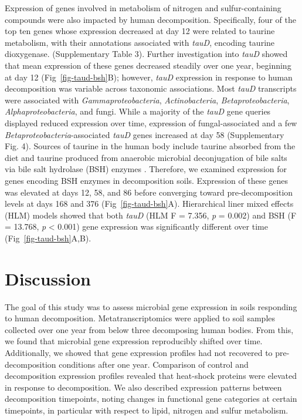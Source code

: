 \documentclass[
  sn-nature,
  lineno, referee]{sn-jnl}
\begin{document}
Expression of genes involved in metabolism of nitrogen and
sulfur-containing compounds were also impacted by human decomposition.
Specifically, four of the top ten genes whose expression decreased at
day 12 were related to taurine metabolism, with their annotations
associated with \emph{tauD}, encoding taurine dioxygenase.
(Supplementary Table 3). Further investigation into \emph{tauD} showed
that mean expression of these genes decreased steadily over one year,
beginning at day 12 (Fig~\ref{fig-taud-bsh}B); however, \emph{tauD}
expression in response to human decomposition was variable across
taxonomic associations. Most \emph{tauD} transcripts were associated
with \emph{Gammaproteobacteria}, \emph{Actinobacteria},
\emph{Betaproteobacteria}, \emph{Alphaproteobacteria}, and fungi. While
a majority of the \emph{tauD} gene queries displayed reduced expression
over time, expression of fungal-associated and a few
\emph{Betaproteobacteria}-associated \emph{tauD} genes increased at day
58 (Supplementary Fig. 4). Sources of taurine in the human body include
taurine absorbed from the diet and taurine produced from anaerobic
microbial deconjugation of bile salts via bile salt hydrolase (BSH)
enzymes \citep{urdaneta_interactions_2017}. Therefore, we examined
expression for genes encoding BSH enzymes in decomposition soils.
Expression of these genes was elevated at days 12, 58, and 86 before
converging toward pre-decomposition levels at days 168 and 376
(Fig~\ref{fig-taud-bsh}A). Hierarchical liner mixed effects (HLM) models
showed that both \emph{tauD} (HLM F = 7.356, \emph{p} = 0.002) and BSH
(F = 13.768, \emph{p} \textless{} 0.001) gene expression was
significantly different over time (Fig~\ref{fig-taud-bsh}A,B).

\section{Discussion}\label{discussion}

The goal of this study was to assess microbial gene expression in soils
responding to human decomposition. Metatranscriptomics were applied to
soil samples collected over one year from below three decomposing human
bodies. From this, we found that microbial gene expression reproducibly
shifted over time. Additionally, we showed that gene expression profiles
had not recovered to pre-decomposition conditions after one year.
Comparison of control and decomposition expression profiles revealed
that heat-shock proteins were elevated in response to decomposition. We
also described expression patterns between decomposition timepoints,
noting changes in functional gene categories at certain timepoints, in
particular with respect to lipid, nitrogen and sulfur metabolism.
\end{document}

